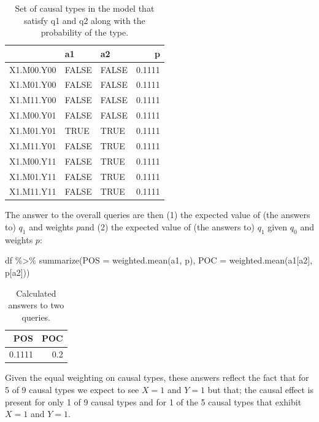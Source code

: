 \documentclass[
  12pt,
]{book}
\newenvironment{Shaded}{\begin{snugshade}}{\end{snugshade}}
\newcommand{\AttributeTok}[1]{\textcolor[rgb]{0.00,0.34,0.68}{#1}}
\newcommand{\FunctionTok}[1]{\textcolor[rgb]{0.39,0.29,0.61}{#1}}
\newcommand{\NormalTok}[1]{\textcolor[rgb]{0.12,0.11,0.11}{#1}}
\newcommand{\SpecialCharTok}[1]{\textcolor[rgb]{0.24,0.68,0.91}{#1}}
\begin{document}
\begin{table}

\caption{\label{tab:unnamed-chunk-4}Set of causal types in the model that satisfy q1 and q2 along with the probability of the type.}
\centering
\begin{tabular}[t]{l|l|l|r}
\hline
  & a1 & a2 & p\\
\hline
X1.M00.Y00 & FALSE & FALSE & 0.1111\\
\hline
X1.M01.Y00 & FALSE & FALSE & 0.1111\\
\hline
X1.M11.Y00 & FALSE & FALSE & 0.1111\\
\hline
X1.M00.Y01 & FALSE & FALSE & 0.1111\\
\hline
X1.M01.Y01 & TRUE & TRUE & 0.1111\\
\hline
X1.M11.Y01 & FALSE & TRUE & 0.1111\\
\hline
X1.M00.Y11 & FALSE & TRUE & 0.1111\\
\hline
X1.M01.Y11 & FALSE & TRUE & 0.1111\\
\hline
X1.M11.Y11 & FALSE & TRUE & 0.1111\\
\hline
\end{tabular}
\end{table}

The answer to the overall queries are then (1) the expected value of (the answers to) \(q_1\) and weights \(p\)and (2) the expected value of (the answers to) \(q_1\) given \(q_0\) and weights \(p\):

\begin{Shaded}
\begin{Highlighting}[]
\NormalTok{df }\SpecialCharTok{\%\textgreater{}\%} \FunctionTok{summarize}\NormalTok{(}\AttributeTok{POS =} \FunctionTok{weighted.mean}\NormalTok{(a1, p),}
                 \AttributeTok{POC =} \FunctionTok{weighted.mean}\NormalTok{(a1[a2], p[a2]))}
\end{Highlighting}
\end{Shaded}

\begin{table}

\caption{\label{tab:unnamed-chunk-6}Calculated answers to two queries.}
\centering
\begin{tabular}[t]{r|r}
\hline
POS & POC\\
\hline
0.1111 & 0.2\\
\hline
\end{tabular}
\end{table}

Given the equal weighting on causal types, these answers reflect the fact that for 5 of 9 causal types we expect to see \(X=1\) and \(Y=1\) but that; the causal effect is present for only 1 of 9 causal types and for 1 of the 5 causal types that exhibit \(X=1\) and \(Y=1\).
\end{document}
